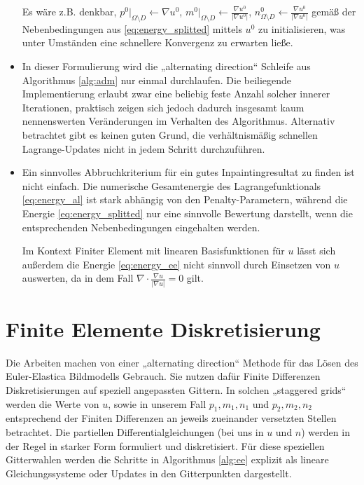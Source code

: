\documentclass{mythesis}
\begin{document}
\begin{algorithm}
\begin{note}
\begin{itemize}
		Es wäre z.B. denkbar, $p^0|_{\Omega\setminus D} \gets \nabla u^0$, $m^0|_{\Omega\setminus D} \gets \frac{\nabla u^0}{|\nabla u^0|}$, $n^0_{\Omega\setminus D} \gets \frac{\nabla u^0}{|\nabla u^0|}$ gemäß der Nebenbedingungen aus \ref{eq:energy_splitted} mittels $u^0$ zu initialisieren, was unter Umständen eine schnellere Konvergenz zu erwarten ließe.
	    \item
		In dieser Formulierung wird die „alternating direction“ Schleife aus Algorithmus \ref{alg:adm} nur einmal durchlaufen.
		Die beiliegende Implementierung erlaubt zwar eine beliebig feste Anzahl solcher innerer Iterationen, praktisch zeigen sich jedoch dadurch insgesamt kaum nennenswerten Veränderungen im Verhalten des Algorithmus.
		Alternativ betrachtet gibt es keinen guten Grund, die verhältnismäßig schnellen Lagrange-Updates nicht in jedem Schritt durchzuführen.
	    \item
		Ein sinnvolles Abbruchkriterium für ein gutes Inpaintingresultat zu finden ist nicht einfach.
		Die numerische Gesamtenergie des Lagrangefunktionals \eqref{eq:energy_al} ist stark abhängig von den Penalty-Parametern, während die Energie \eqref{eq:energy_splitted} nur eine sinnvolle Bewertung darstellt, wenn die entsprechenden Nebenbedingungen eingehalten werden.

		Im Kontext Finiter Element mit linearen Basisfunktionen für $u$ lässt sich außerdem
		die Energie \eqref{eq:energy_ee} nicht sinnvoll durch Einsetzen von $u$ auswerten, da in dem Fall $\nabla \cdot \frac{\nabla u}{|\nabla u|} = 0$ gilt.
	\end{itemize}
    \end{note}
\end{algorithm}


\section{Finite Elemente Diskretisierung}

Die Arbeiten \cite{duan2013fast,hahn2011fast,tai2011fast,yashtini2015alternating} machen von einer „alternating direction“ Methode für das Lösen des Euler-Elastica Bildmodells Gebrauch.
Sie nutzen dafür Finite Differenzen Diskretisierungen auf speziell angepassten Gittern.
In solchen „staggered grids“ \cite{tai2011fast} werden die Werte von $u$, sowie in unserem Fall $p_1, m_1, n_1$ und $p_2, m_2, n_2$ entsprechend der Finiten Differenzen an jeweils zueinander versetzten Stellen betrachtet.
Die partiellen Differentialgleichungen (bei uns in $u$ und $n$) werden in der Regel in starker Form formuliert und diskretisiert.
Für diese speziellen Gitterwahlen werden die Schritte in Algorithmus \ref{alg:ee} explizit als lineare Gleichungssysteme oder Updates in den Gitterpunkten dargestellt.
\end{document}
